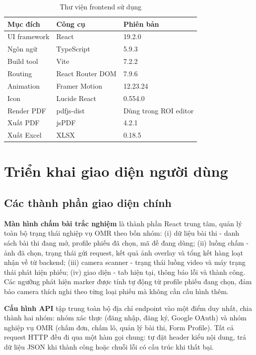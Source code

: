 \begin{table}[H]
\centering
\caption{Thư viện frontend sử dụng}
\label{tab:thu-vien-frontend}
\begin{tabular}{|L{3.7cm}|L{5.2cm}|L{3.0cm}|}
\hline
\textbf{Mục đích} & \textbf{Công cụ} & \textbf{Phiên bản} \\
\hline
UI framework & React~\cite{react} & 19.2.0 \\
\hline
Ngôn ngữ & TypeScript & 5.9.3 \\
\hline
Build tool & Vite~\cite{vite} & 7.2.2 \\
\hline
Routing & React Router DOM & 7.9.6 \\
\hline
Animation & Framer Motion & 12.23.24 \\
\hline
Icon & Lucide React & 0.554.0 \\
\hline
Render PDF & pdfjs-dist & Dùng trong ROI editor \\
\hline
Xuất PDF & jsPDF & 4.2.1 \\
\hline
Xuất Excel & XLSX & 0.18.5 \\
\hline
\end{tabular}
\end{table}

\section{Triển khai giao diện người dùng}
\subsection{Các thành phần giao diện chính}

\textbf{Màn hình chấm bài trắc nghiệm} là thành phần React trung tâm, quản lý toàn bộ trạng thái nghiệp vụ OMR theo bốn nhóm: (i) dữ liệu bài thi - danh sách bài thi đang mở, profile phiếu đã chọn, mã đề đang dùng; (ii) luồng chấm - ảnh đã chọn, trạng thái gửi request, kết quả ảnh overlay và tổng kết hàng loạt nhận về từ backend; (iii) camera scanner - trạng thái luồng video và máy trạng thái phát hiện phiếu; (iv) giao diện - tab hiện tại, thông báo lỗi và thành công. Các ngưỡng phát hiện marker được tính tự động từ profile phiếu đang chọn, đảm bảo camera thích nghi theo từng loại phiếu mà không cần cấu hình thêm.

\textbf{Cấu hình API} tập trung toàn bộ địa chỉ endpoint vào một điểm duy nhất, chia thành hai nhóm: nhóm xác thực (đăng nhập, đăng ký, Google OAuth) và nhóm nghiệp vụ OMR (chấm đơn, chấm lô, quản lý bài thi, Form Profile). Tất cả request HTTP đều đi qua một hàm gọi chung: tự đặt header kiểu nội dung, trả dữ liệu JSON khi thành công hoặc chuỗi lỗi có cấu trúc khi thất bại.

